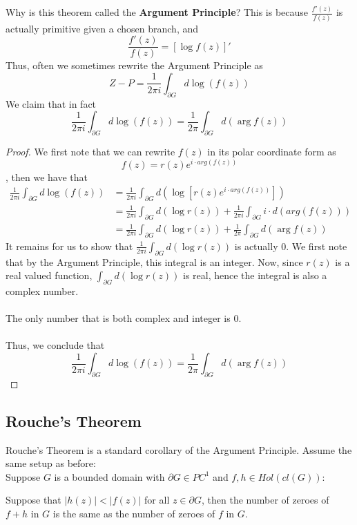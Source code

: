 \begin{remark}
Why is this theorem called the \textbf{Argument Principle}? This is because $\frac{f'(z)}{f(z)}$ is actually primitive given a chosen branch, and
\[\frac{f'(z)}{f(z)} = [\log f(z)]'\]
Thus, often we sometimes rewrite the Argument Principle as
\[Z - P = \frac{1}{2\pi i} \int_{\partial G} d \log(f(z))\]
We claim that in fact
\[\frac{1}{2\pi i} \int_{\partial G} d \log(f(z)) = \frac{1}{2\pi} \int_{\partial G} d(\arg f(z))\]
\end{remark}

\begin{proof}
We first note that we can rewrite $f(z)$ in its polar coordinate form as
\[f(z) = r(z) e^{i \cdot arg(f(z))}\]
, then we have that
\begin{align*}
    \frac{1}{2\pi i} \int_{\partial G} d \log(f(z)) &= \frac{1}{2\pi i} \int_{\partial G} d(\log[r(z)e^{i \cdot arg(f(z))}])\\
    &= \frac{1}{2\pi i} \int_{\partial G} d(\log r(z)) + \frac{1}{2\pi i} \int_{\partial G} i \cdot d(arg(f(z)))\\
    &= \frac{1}{2\pi i} \int_{\partial G} d(\log r(z)) + \frac{1}{2\pi} \int_{\partial G} d(\arg f(z))
\end{align*}
It remains for us to show that $\frac{1}{2\pi i} \int_{\partial G} d(\log r(z))$ is actually $0$. We first note that by the Argument Principle, this integral is an integer. Now, since $r(z)$ is a real valued function, $\int_{\partial G} d(\log r(z))$ is real, hence the integral is also a complex number.\\\\
The only number that is both complex and integer is $0$.\\\\
Thus, we conclude that
\[\frac{1}{2\pi i} \int_{\partial G} d \log(f(z)) = \frac{1}{2\pi} \int_{\partial G} d(\arg f(z))\]
\end{proof}

\subsection{Rouche's Theorem}

Rouche's Theorem is a standard corollary of the Argument Principle. Assume the same setup as before:\\

Suppose $G$ is a bounded domain with $\partial G \in PC^1$ and $f, h \in Hol(cl(G))$:

\begin{theorem}
Suppose that $|h(z)| < |f(z)|$ for all $z \in \partial G$, then the number of zeroes of $f + h$ in $G$ is the same as the number of zeroes of $f$ in $G$.
\end{theorem}

